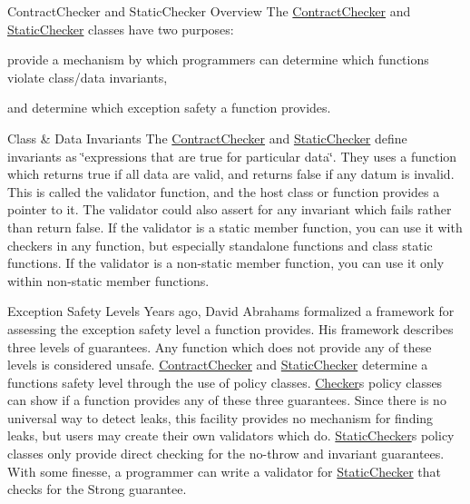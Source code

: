 \begin{DoxyParagraph}{Contract\+Checker and Static\+Checker Overview}
The \hyperlink{classLoki_1_1ContractChecker}{Contract\+Checker} and \hyperlink{classLoki_1_1StaticChecker}{Static\+Checker} classes have two purposes\+:
\begin{DoxyItemize}
\item provide a mechanism by which programmers can determine which functions violate class/data invariants,
\item and determine which exception safety a function provides.
\end{DoxyItemize}
\end{DoxyParagraph}
\begin{DoxyParagraph}{Class \& Data Invariants}
The \hyperlink{classLoki_1_1ContractChecker}{Contract\+Checker} and \hyperlink{classLoki_1_1StaticChecker}{Static\+Checker} define invariants as \char`\"{}expressions that
are true for particular data\char`\"{}. They uses a function which returns true if all data are valid, and returns false if any datum is invalid. This is called the validator function, and the host class or function provides a pointer to it. The validator could also assert for any invariant which fails rather than return false. If the validator is a static member function, you can use it with checkers in any function, but especially standalone functions and class static functions. If the validator is a non-\/static member function, you can use it only within non-\/static member functions.
\end{DoxyParagraph}
\begin{DoxyParagraph}{Exception Safety Levels}
Years ago, David Abrahams formalized a framework for assessing the exception safety level a function provides. His framework describes three levels of guarantees. Any function which does not provide any of these levels is considered unsafe. \hyperlink{classLoki_1_1ContractChecker}{Contract\+Checker} and \hyperlink{classLoki_1_1StaticChecker}{Static\+Checker} determine a function\textquotesingle{}s safety level through the use of policy classes. \hyperlink{classChecker}{Checker}\textquotesingle{}s policy classes can show if a function provides any of these three guarantees. Since there is no universal way to detect leaks, this facility provides no mechanism for finding leaks, but users may create their own validators which do. \hyperlink{classLoki_1_1StaticChecker}{Static\+Checker}\textquotesingle{}s policy classes only provide direct checking for the no-\/throw and invariant guarantees. With some finesse, a programmer can write a validator for \hyperlink{classLoki_1_1StaticChecker}{Static\+Checker} that checks for the Strong guarantee.
\end{DoxyParagraph}

